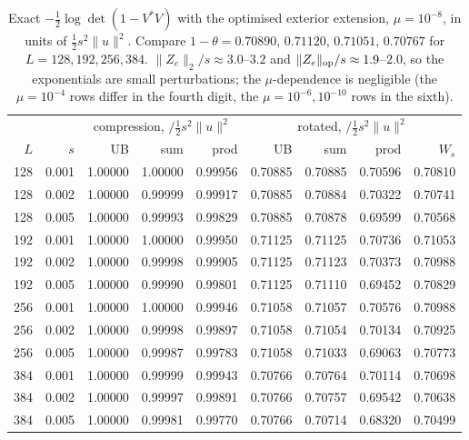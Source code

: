 \documentclass[11pt]{article}
\begin{document}
\begin{table}[htbp]\centering\small
\begin{tabular}{r r | r r r | r r r r}
\toprule
&&\multicolumn{3}{c|}{compression, $/\frac12 s^2\|u\|^2$}&\multicolumn{4}{c}{rotated, $/\frac12 s^2\|u\|^2$}\\
$L$&$s$&UB&sum&prod&UB&sum&prod&$W_s$\\
\midrule
128&0.001&1.00000&1.00000&0.99956&0.70885&0.70885&0.70596&0.70810\\
128&0.002&1.00000&0.99999&0.99917&0.70885&0.70884&0.70322&0.70741\\
128&0.005&1.00000&0.99993&0.99829&0.70885&0.70878&0.69599&0.70568\\
192&0.001&1.00000&1.00000&0.99950&0.71125&0.71125&0.70736&0.71053\\
192&0.002&1.00000&0.99998&0.99905&0.71125&0.71123&0.70373&0.70988\\
192&0.005&1.00000&0.99990&0.99801&0.71125&0.71110&0.69452&0.70829\\
256&0.001&1.00000&1.00000&0.99946&0.71058&0.71057&0.70576&0.70988\\
256&0.002&1.00000&0.99998&0.99897&0.71058&0.71054&0.70134&0.70925\\
256&0.005&1.00000&0.99987&0.99783&0.71058&0.71033&0.69063&0.70773\\
384&0.001&1.00000&0.99999&0.99943&0.70766&0.70764&0.70114&0.70698\\
384&0.002&1.00000&0.99997&0.99891&0.70766&0.70757&0.69542&0.70638\\
384&0.005&1.00000&0.99981&0.99770&0.70766&0.70714&0.68320&0.70499\\
\bottomrule
\end{tabular}
\caption{Exact $-\frac12\log\det(1-V^*V)$ with the optimised exterior extension,
$\mu=10^{-8}$, in units of $\frac12 s^2\|u\|^2$.  Compare $1-\theta=0.70890$, $0.71120$,
$0.71051$, $0.70767$ for $L=128,192,256,384$.  $\|Z_e\|_2/s\approx3.0$--$3.2$ and
$\|Z_e\|_{\rm op}/s\approx1.9$--$2.0$, so the exponentials are small perturbations; the
$\mu$-dependence is negligible (the $\mu=10^{-4}$ rows differ in the fourth digit, the
$\mu=10^{-6},10^{-10}$ rows in the sixth).}
\label{tab:exact}
\end{table}
\end{document}
